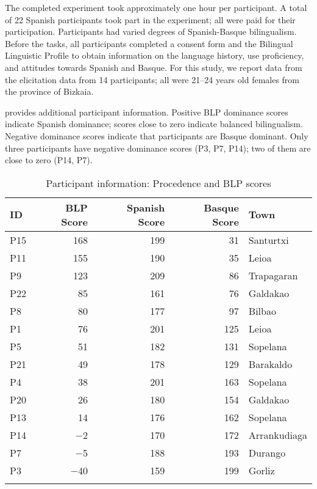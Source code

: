 \documentclass[output=paper,colorlinks,citecolor=brown,draftmode]{langscibook}
\begin{document}
The completed experiment took approximately one hour per participant. A total of 22 Spanish participants took part in the experiment; all were paid for their participation. Participants had varied degrees of Spanish-Basque bilingualism. Before the tasks, all participants completed a consent form and the Bilingual Linguistic Profile \citep[BLP;][]{birdsong2012bilingual} to obtain information on the language history, use proficiency, and attitudes towards Spanish and Basque. For this study, we report data from the elicitation data from 14 participants; all were 21--24 years old females from the province of Bizkaia.

 provides additional participant information. Positive BLP dominance scores indicate Spanish dominance; scores close to zero indicate balanced bilingualism. Negative dominance scores indicate that participants are Basque dominant. Only three participants have negative dominance scores (P3, P7, P14); two of them are close to zero (P14, P7).\\

\begin{table}
\caption{Participant information: Procedence and BLP scores}
\label{13:table1}
 \begin{tabular}{lrrrl}
  \lsptoprule
ID & BLP Score & Spanish Score & Basque Score & Town\\
  \midrule
P15  & 168       & 199           & 31           & Santurtxi    \\
P11  & 155       & 190           & 35           & Leioa        \\
P9   & 123       & 209           & 86           & Trapagaran   \\
P22  & 85        & 161           & 76           & Galdakao     \\
P8   & 80        & 177           & 97           & Bilbao       \\
P1   & 76        & 201           & 125          & Leioa        \\
P5   & 51        & 182           & 131          & Sopelana     \\
P21  & 49        & 178           & 129          & Barakaldo    \\
P4   & 38        & 201           & 163          & Sopelana     \\
P20  & 26        & 180           & 154          & Galdakao     \\
P13  & 14        & 176           & 162          & Sopelana     \\
P14  & $-$2        & 170           & 172          & Arrankudiaga \\
P7   & $-$5        & 188           & 193          & Durango      \\
P3   & $-$40       & 159           & 199          & Gorliz       \\
  \lspbottomrule
 \end{tabular}
\end{table}
\end{document}
